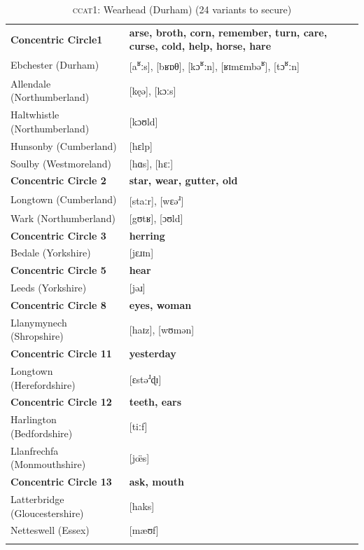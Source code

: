 \begin{table}
\begin{tabularx}{\textwidth}{lX}
\lsptoprule 
\textbf{Concentric Circle1} & \textbf{arse, broth, corn, remember, turn, care, curse, cold, help, horse, hare} \\
Ebchester (Durham) & [a\textsuperscript{ʁ}ːs], [bʁɒθ], [kɔ\textsuperscript{ʁ}ːn], [ʁɪmɛmbə\textsuperscript{ʁ}], [tɔ\textsuperscript{ʁ}ːn] \\
Allendale (Northumberland) &  [kęə],  [kɔːs] \\
Haltwhistle (Northumberland) & [kɔʊld]   \\
Hunsonby (Cumberland) &   [hɛlp]\\
Soulby (Westmoreland) & [hɑs], [hɛː]  \\
\midrule\textbf{Concentric Circle 2} & \textbf{star, wear, gutter, old} \\
Longtown (Cumberland) & [staːr], [wɛə\textsuperscript{ɹ}] \\
Wark (Northumberland) &  [gʊtʁ], [ɔʊld]\\
\midrule\textbf{Concentric Circle 3} & \textbf{herring}\\
Bedale (Yorkshire) & [jɛɹɪn]  \\
\midrule\textbf{Concentric Circle 5} & \textbf{hear}\\
Leeds (Yorkshire) & [jəɹ] \\
\midrule\textbf{Concentric Circle 8} & \textbf{eyes, woman}\\
Llanymynech (Shropshire) & [haɪz], [wʊmən]  \\
 \midrule\textbf{Concentric Circle 11} & \textbf{yesterday}\\
Longtown (Herefordshire) &  [ɛstə\textsuperscript{ɹ}ɖɪ]\\
\midrule\textbf{Concentric Circle 12} & \textbf{teeth, ears}\\
Harlington (Bedfordshire) & [tiːf]\\
Llanfrechfa (Monmouthshire) & [j\"œs]\\
\midrule\textbf{Concentric Circle 13} & \textbf{ask, mouth}\\
Latterbridge (Gloucestershire) &  [haks] \\
Netteswell (Essex) & [mæʊf]\\
\lspbottomrule 
\end{tabularx}
\caption{\textsc{ccat1}: Wearhead (Durham)  (24 variants to secure)}
\label{Table 5.2}
\end{table}

